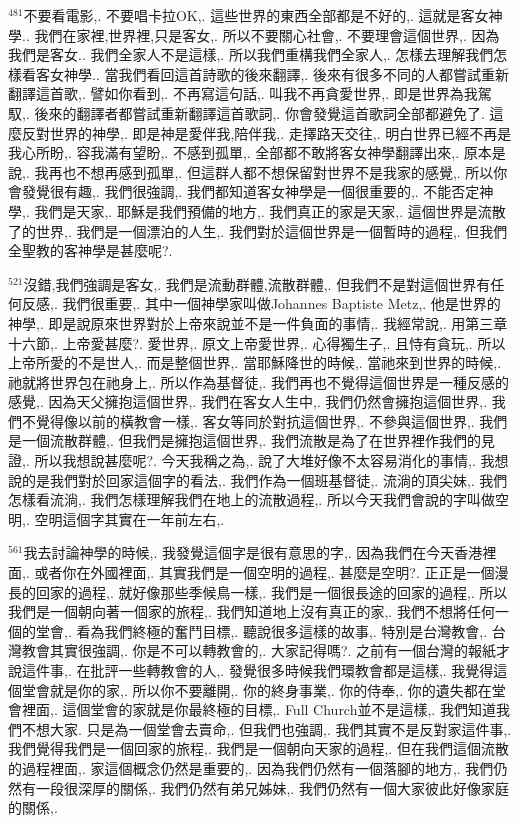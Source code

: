 \documentclass{book}
\begin{document}
$^{481}$不要看電影,.
不要唱卡拉OK,.
這些世界的東西全部都是不好的,.
這就是客女神學..
我們在家裡,世界裡,只是客女,.
所以不要關心社會,.
不要理會這個世界,.
因為我們是客女..
我們全家人不是這樣,.
所以我們重構我們全家人,.
怎樣去理解我們怎樣看客女神學..
當我們看回這首詩歌的後來翻譯,.
後來有很多不同的人都嘗試重新翻譯這首歌,.
譬如你看到,.
不再寫這句話,.
叫我不再貪愛世界,.
即是世界為我駕馭,.
後來的翻譯者都嘗試重新翻譯這首歌詞,.
你會發覺這首歌詞全部都避免了.
這麼反對世界的神學,.
即是神是愛伴我,陪伴我,.
走擇路天交往,.
明白世界已經不再是我心所盼,.
容我滿有望盼,.
不感到孤單,.
全部都不敢將客女神學翻譯出來,.
原本是說,.
我再也不想再感到孤單,.
但這群人都不想保留對世界不是我家的感覺,.
所以你會發覺很有趣,.
我們很強調,.
我們都知道客女神學是一個很重要的,.
不能否定神學,.
我們是天家,.
耶穌是我們預備的地方,.
我們真正的家是天家,.
這個世界是流散了的世界,.
我們是一個漂泊的人生,.
我們對於這個世界是一個暫時的過程,.
但我們全聖教的客神學是甚麼呢?.

$^{521}$沒錯,我們強調是客女,.
我們是流動群體,流散群體,.
但我們不是對這個世界有任何反感,.
我們很重要,.
其中一個神學家叫做Johannes Baptiste Metz,.
他是世界的神學,.
即是說原來世界對於上帝來說並不是一件負面的事情,.
我經常說,.
用第三章十六節,.
上帝愛甚麼?.
愛世界,.
原文上帝愛世界,.
心得獨生子,.
且恃有貪玩,.
所以上帝所愛的不是世人,.
而是整個世界,.
當耶穌降世的時候,.
當祂來到世界的時候,.
祂就將世界包在祂身上,.
所以作為基督徒,.
我們再也不覺得這個世界是一種反感的感覺,.
因為天父擁抱這個世界,.
我們在客女人生中,.
我們仍然會擁抱這個世界,.
我們不覺得像以前的橫教會一樣,.
客女等同於對抗這個世界,.
不參與這個世界,.
我們是一個流散群體,.
但我們是擁抱這個世界,.
我們流散是為了在世界裡作我們的見證,.
所以我想說甚麼呢?.
今天我稱之為,.
說了大堆好像不太容易消化的事情,.
我想說的是我們對於回家這個字的看法,.
我們作為一個班基督徒,.
流淌的頂尖妹,.
我們怎樣看流淌,.
我們怎樣理解我們在地上的流散過程,.
所以今天我們會說的字叫做空明,.
空明這個字其實在一年前左右,.

$^{561}$我去討論神學的時候,.
我發覺這個字是很有意思的字,.
因為我們在今天香港裡面,.
或者你在外國裡面,.
其實我們是一個空明的過程,.
甚麼是空明?.
正正是一個漫長的回家的過程,.
就好像那些季候鳥一樣,.
我們是一個很長途的回家的過程,.
所以我們是一個朝向著一個家的旅程,.
我們知道地上沒有真正的家,.
我們不想將任何一個的堂會,.
看為我們終極的奮鬥目標,.
聽說很多這樣的故事,.
特別是台灣教會,.
台灣教會其實很強調,.
你是不可以轉教會的,.
大家記得嗎?.
之前有一個台灣的報紙才說這件事,.
在批評一些轉教會的人,.
發覺很多時候我們環教會都是這樣,.
我覺得這個堂會就是你的家,.
所以你不要離開,.
你的終身事業,.
你的侍奉,.
你的遺失都在堂會裡面,.
這個堂會的家就是你最終極的目標,.
Full Church並不是這樣,.
我們知道我們不想大家.
只是為一個堂會去賣命,.
但我們也強調,.
我們其實不是反對家這件事,.
我們覺得我們是一個回家的旅程,.
我們是一個朝向天家的過程,.
但在我們這個流散的過程裡面,.
家這個概念仍然是重要的,.
因為我們仍然有一個落腳的地方,.
我們仍然有一段很深厚的關係,.
我們仍然有弟兄姊妹,.
我們仍然有一個大家彼此好像家庭的關係,.
\end{document}
